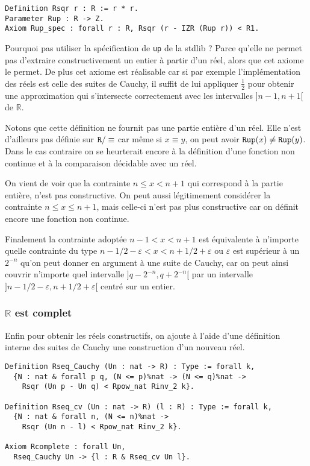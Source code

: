 \documentclass[10pt]{article}
\begin{document}
\begin{verbatim}
Definition Rsqr r : R := r * r.
Parameter Rup : R -> Z.
Axiom Rup_spec : forall r : R, Rsqr (r - IZR (Rup r)) < R1.
\end{verbatim}

Pourquoi pas utiliser la spécification de {\tt up} de la stdlib ? Parce qu'elle ne permet pas d'extraire constructivement un entier à partir d'un réel, alors que cet axiome le permet. De plus cet axiome est réalisable car si par exemple l'implémentation des réels est celle des suites de Cauchy, il suffit de lui appliquer $\frac12$ pour obtenir une approximation qui s'intersecte correctement avec les intervalles $]n-1,n+1[$ de $\mathbb{R}$.

Notons que cette définition ne fournit pas une partie entière d'un réel. Elle n'est d'ailleurs pas définie sur $\mbox{\tt R}/\equiv$ car même si $x\equiv y$, on peut avoir $\mbox{\tt Rup}(x) \ne \mbox{\tt Rup}(y)$. Dans le cas contraire on se heurterait encore à la définition d'une fonction non continue et à la comparaison décidable avec un réel.

On vient de voir que la contrainte $n ≤ x < n+1$ qui correspond à la partie entière, n'est pas constructive. On peut aussi légitimement considérer la contrainte $n ≤ x ≤ n+1$, mais celle-ci n'est pas plus constructive car on définit encore une fonction non continue.

Finalement la contrainte adoptée $n-1 < x < n+1$ est équivalente à n'importe quelle contrainte du type $n-1/2-\varepsilon < x < n+1/2+\varepsilon$ ou $\varepsilon$ est supérieur à un $2^{-n}$ qu'on peut donner en argument à une suite de Cauchy, car on peut ainsi couvrir n'importe quel intervalle $]q-2^{-n},q+2^{-n}[$ par un intervalle $]n-1/2-\varepsilon, n+1/2+\varepsilon[$ centré sur un entier.

\subsubsection{$\mathbb{R}$ est complet}

Enfin pour obtenir les réels constructifs, on ajoute à l'aide d'une définition interne des suites de Cauchy une construction d'un nouveau réel.

\begin{verbatim}
Definition Rseq_Cauchy (Un : nat -> R) : Type := forall k,
  {N : nat & forall p q, (N <= p)%nat -> (N <= q)%nat ->
    Rsqr (Un p - Un q) < Rpow_nat Rinv_2 k}.

Definition Rseq_cv (Un : nat -> R) (l : R) : Type := forall k,
  {N : nat & forall n, (N <= n)%nat ->
    Rsqr (Un n - l) < Rpow_nat Rinv_2 k}.

Axiom Rcomplete : forall Un, 
  Rseq_Cauchy Un -> {l : R & Rseq_cv Un l}.
\end{verbatim}
\end{document}
